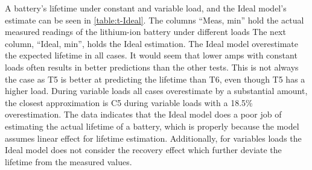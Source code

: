 A battery's lifetime under constant and variable load, and the Ideal model's estimate can be seen in \cref{table:t-Ideal}.
The columns ``Meas, min'' hold the actual measured readings of the lithium-ion battery under different loads 
The next column, ``Ideal, min'', holds the Ideal estimation. 
The Ideal model overestimate the expected lifetime in all cases.
It would seem that lower amps with constant loads often results in better predictions than the other tests.
This is not always the case as T5 is better at predicting the lifetime than T6, even though T5 has a higher load.
During variable loads all cases overestimate by a substantial amount, the closest approximation is C5 during variable loads with a 18.5\% overestimation.
The data indicates that the Ideal model does a poor job of estimating the actual lifetime of a battery, which is properly because the model assumes linear effect for lifetime estimation.
Additionally, for variables loads the Ideal model does not consider the recovery effect which further deviate the lifetime from the measured values.
